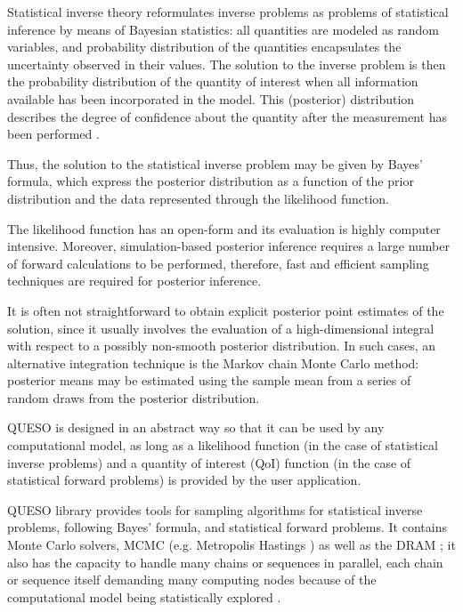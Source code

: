 Statistical inverse theory reformulates inverse problems as problems of statistical inference by means of Bayesian statistics: all quantities are modeled as random variables, and probability distribution of the quantities encapsulates the uncertainty observed in their values. The solution to the inverse problem is then the probability distribution of the quantity of interest when all information available has been incorporated in the model. This (posterior) distribution describes the degree of confidence about the quantity after the measurement has been performed \cite{KaSo05}.

Thus, the solution to the statistical inverse problem may be given by Bayes' formula, which express the posterior distribution as a function of the prior distribution and the data represented through the likelihood function.

The likelihood function has an open-form and its evaluation is highly computer intensive.  Moreover, simulation-based posterior inference requires a large number of forward calculations to be performed, therefore, fast and efficient sampling techniques are required for posterior inference.

It is often not straightforward to obtain explicit posterior point estimates of the solution, since it usually involves the evaluation of a high-dimensional integral with respect to a possibly non-smooth posterior distribution. In such cases, an alternative integration technique is the Markov chain Monte Carlo method: posterior means may be estimated using the sample mean from a series of random draws from the posterior distribution.

QUESO is designed in an abstract way so that it can be used by any computational model, as long as a likelihood function (in the case of statistical inverse problems) and a quantity of interest (QoI) function (in the case of statistical forward problems) is provided by the user application.

QUESO library provides tools for sampling algorithms for statistical inverse problems, following Bayes' formula, and statistical forward problems. It contains Monte Carlo solvers, MCMC (e.g. Metropolis Hastings \cite{Metr_1953,Hast_1970}) as well as the DRAM \cite{HaLaMiSa06}; it also has the capacity to handle many chains or sequences in parallel, each chain or sequence itself demanding many computing nodes because of the computational model being statistically explored \cite{PrSc09}.



